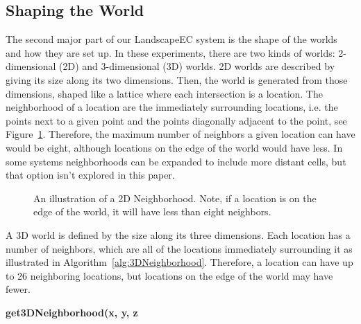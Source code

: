 \documentclass[12pt]{article}
\begin{document}
\subsection{Shaping the World}
\label{sec:shapingtheworld}
The second major part of our LandscapeEC system is the shape of the worlds and how they are set up. In these experiments, there are two kinds of worlds: 2-dimensional (2D) and 3-dimensional (3D) worlds. 2D worlds are described by giving its size along its two dimensions. Then, the world is generated from those dimensions, shaped like a lattice where each intersection is a location. The neighborhood of a location are the immediately surrounding locations, i.e. the points next to a given point and the points diagonally adjacent to the point, see Figure~\ref{fig:2DNeighborhood}. Therefore, the maximum number of neighbors a given location can have would be eight, although locations on the edge of the world would have less. In some systems neighborhoods can be expanded to include more distant cells, but that option isn't explored in this paper. 

\begin{figure}[tb]

 \centering
 \caption{An illustration of a 2D Neighborhood. Note, if a location is on the edge of the world, it will have less than eight neighbors.}
 \label{fig:2DNeighborhood}

\end{figure}


A 3D world is defined by the size along its three dimensions. Each location has a number of neighbors, which are all of the locations immediately surrounding it as illustrated in Algorithm~\ref{alg:3DNeighborhood}. Therefore, a location can have up to 26 neighboring locations, but locations on the edge of the world may have fewer.

\begin{algorithm}[tb]
{\bf get3DNeighborhood(x, y, z}
\caption{Pseudocode finding the neighborhood list in a 3D world. x, y, and z are the 3D coordinates of the location in the world.}
\label{alg:3DNeighborhood}
\end{algorithm}
\end{document}
